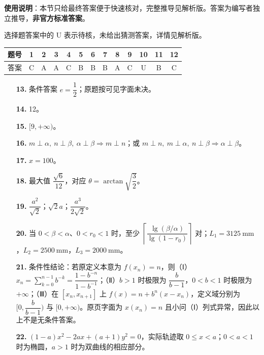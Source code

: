 
\begin{gknotice}
\textbf{使用说明}：本节只给最终答案便于快速核对，完整推导见解析版。答案为编写者独立推导，\textbf{非官方标准答案}。
\end{gknotice}

\begin{gknotice}
选择题答案中的 U 表示待核，未给出猜测答案，详情见解析版。
\end{gknotice}

\begin{center}\begin{tabular}{ccccccccccccc}
\toprule
题号 & 1 & 2 & 3 & 4 & 5 & 6 & 7 & 8 & 9 & 10 & 11 & 12 \\
\midrule
答案 & C & A & A & C & B & B & B & A & C & U & B & C \\
\bottomrule
\end{tabular}\end{center}

\begin{itemize}[leftmargin=2.6em]
  \item[\textbf{13.}] 条件答案 $e=\dfrac12$；原题按可见字面未决。
  \item[\textbf{14.}] 12。
  \item[\textbf{15.}] $[9,+\infty)$。
  \item[\textbf{16.}] $m\perp\alpha,\ n\perp\beta,\ \alpha\perp\beta\Rightarrow m\perp n$；或 $m\perp n,\ m\perp\alpha,\ n\perp\beta\Rightarrow\alpha\perp\beta$。
\end{itemize}

\begin{itemize}[leftmargin=2.6em]
  \item[\textbf{17.}] $x=100$。
  \item[\textbf{18.}] 最大值 $\dfrac{\sqrt6}{12}$，对应 $\theta=\arctan\sqrt{\dfrac32}$。
  \item[\textbf{19.}] $\dfrac{a^2}{\sqrt2}$；$\sqrt2a$；$\dfrac{a^3}{2\sqrt2}$。
  \item[\textbf{20.}] 当 $0<\beta<\alpha$、$0<r_0<1$ 时，至少 $\left\lceil\dfrac{\lg(\beta/\alpha)}{\lg(1-r_0)}\right\rceil$ 对；$L_1=3125\ \mathrm{mm}$，$L_2=2500\ \mathrm{mm}$，$L_3=2000\ \mathrm{mm}$。
  \item[\textbf{21.}] 条件性结论：若原定义本意为 $f(x_n)=n$，则（Ⅰ）$x_n=\sum_{k=0}^{n-1}b^{-k}=\dfrac{1-b^{-n}}{1-b^{-1}}$；（Ⅱ）$b>1$ 时极限为 $\dfrac{b}{b-1}$，$0<b<1$ 时极限为 $+\infty$；（Ⅲ）在 $[x_n,x_{n+1}]$ 上 $f(x)=n+b^n(x-x_n)$，定义域分别为 $[0,\dfrac{b}{b-1})$ 与 $[0,+\infty)$。原页字面为 $x(x_n)=n$ 且小问（Ⅰ）列式异常，因此以上不是无条件答案。
  \item[\textbf{22.}] $(1-a)x^2-2ax+(a+1)y^2=0$，实际轨迹取 $0\leq x<a$；$0<a<1$ 时为椭圆，$a>1$ 时为双曲线的相应部分。
\end{itemize}
